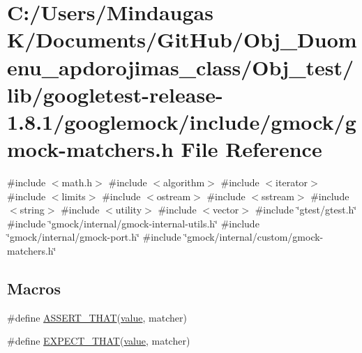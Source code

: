 \hypertarget{_obj__test_2lib_2googletest-release-1_88_81_2googlemock_2include_2gmock_2gmock-matchers_8h}{}\section{C\+:/\+Users/\+Mindaugas K/\+Documents/\+Git\+Hub/\+Obj\+\_\+\+Duomenu\+\_\+apdorojimas\+\_\+class/\+Obj\+\_\+test/lib/googletest-\/release-\/1.8.1/googlemock/include/gmock/gmock-\/matchers.h File Reference}
\label{_obj__test_2lib_2googletest-release-1_88_81_2googlemock_2include_2gmock_2gmock-matchers_8h}
{\ttfamily \#include $<$math.\+h$>$}\newline
{\ttfamily \#include $<$algorithm$>$}\newline
{\ttfamily \#include $<$iterator$>$}\newline
{\ttfamily \#include $<$limits$>$}\newline
{\ttfamily \#include $<$ostream$>$}\newline
{\ttfamily \#include $<$sstream$>$}\newline
{\ttfamily \#include $<$string$>$}\newline
{\ttfamily \#include $<$utility$>$}\newline
{\ttfamily \#include $<$vector$>$}\newline
{\ttfamily \#include \char`\"{}gtest/gtest.\+h\char`\"{}}\newline
{\ttfamily \#include \char`\"{}gmock/internal/gmock-\/internal-\/utils.\+h\char`\"{}}\newline
{\ttfamily \#include \char`\"{}gmock/internal/gmock-\/port.\+h\char`\"{}}\newline
{\ttfamily \#include \char`\"{}gmock/internal/custom/gmock-\/matchers.\+h\char`\"{}}\newline
\subsection*{Macros}
\begin{DoxyCompactItemize}
\item 
\#define \mbox{\hyperlink{_obj__test_2lib_2googletest-release-1_88_81_2googlemock_2include_2gmock_2gmock-matchers_8h_a41d888579850c16583baea33ee8d057e}{A\+S\+S\+E\+R\+T\+\_\+\+T\+H\+AT}}(\mbox{\hyperlink{_obj__test_2lib_2googletest-master_2googlemock_2test_2gmock-matchers__test_8cc_a337b8a670efc0b086ad3af163f3121b6}{value}},  matcher)
\item 
\#define \mbox{\hyperlink{_obj__test_2lib_2googletest-release-1_88_81_2googlemock_2include_2gmock_2gmock-matchers_8h_ac31e206123aa702e1152bb2735b31409}{E\+X\+P\+E\+C\+T\+\_\+\+T\+H\+AT}}(\mbox{\hyperlink{_obj__test_2lib_2googletest-master_2googlemock_2test_2gmock-matchers__test_8cc_a337b8a670efc0b086ad3af163f3121b6}{value}},  matcher)
\end{DoxyCompactItemize}
